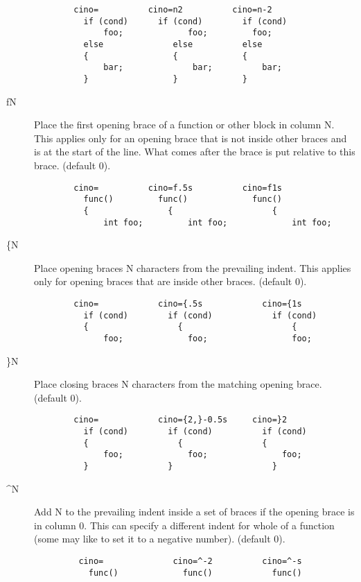 \begin{description}
\begin{verbatim}
        cino=          cino=n2          cino=n-2
          if (cond)      if (cond)        if (cond)
              foo;             foo;         foo;
          else              else          else
          {                 {             {
              bar;              bar;          bar;
          }                 }             }
\end{verbatim}
\clearpage
    \item[fN] Place the first opening brace of a function or other block in
          column N.  This applies only for an opening brace that is not
          inside other braces and is at the start of the line.  What comes
          after the brace is put relative to this brace.  (default 0).
\begin{verbatim}
        cino=          cino=f.5s          cino=f1s
          func()         func()             func()
          {                {                    {
              int foo;         int foo;             int foo;
\end{verbatim}
    \item[\{N] Place opening braces N characters from the prevailing indent.
          This applies only for opening braces that are inside other
          braces.  (default 0).
\begin{verbatim}
        cino=            cino={.5s            cino={1s
          if (cond)        if (cond)            if (cond)
          {                  {                      {
              foo;             foo;                 foo;
 \end{verbatim}
    \item[\}N] Place closing braces N characters from the matching opening
          brace.  (default 0).
\begin{verbatim}
        cino=            cino={2,}-0.5s     cino=}2
          if (cond)        if (cond)          if (cond)
          {                  {                {
              foo;             foo;               foo;
          }                }                    }
 \end{verbatim}
 \clearpage
    \item[\^{}N] Add N to the prevailing indent inside a set of braces if the
          opening brace is in column 0.  This can specify a different
          indent for whole of a function (some may like to set it to a
          negative number).  (default 0).
\begin{verbatim}
         cino=              cino=^-2          cino=^-s
           func()             func()            func()

\end{verbatim}
\end{description}
